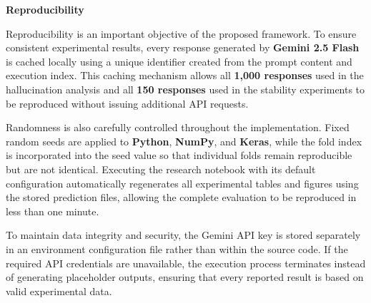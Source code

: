 \textbf{Reproducibility}

Reproducibility is an important objective of the proposed framework. To
ensure consistent experimental results, every response generated by
\textbf{Gemini 2.5 Flash} is cached locally using a unique identifier
created from the prompt content and execution index. This caching
mechanism allows all \textbf{1,000 responses} used in the hallucination
analysis and all \textbf{150 responses} used in the stability
experiments to be reproduced without issuing additional API requests.

Randomness is also carefully controlled throughout the implementation.
Fixed random seeds are applied to \textbf{Python}, \textbf{NumPy}, and
\textbf{Keras}, while the fold index is incorporated into the seed value
so that individual folds remain reproducible but are not identical.
Executing the research notebook with its default configuration
automatically regenerates all experimental tables and figures using the
stored prediction files, allowing the complete evaluation to be
reproduced in less than one minute.

To maintain data integrity and security, the Gemini API key is stored
separately in an environment configuration file rather than within the
source code. If the required API credentials are unavailable, the
execution process terminates instead of generating placeholder outputs,
ensuring that every reported result is based on valid experimental data.

